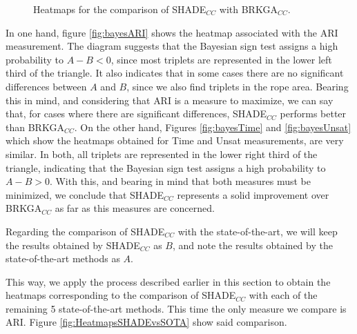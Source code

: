 \begin{figure}[bth]
	\myfloatalign
	 \quad
	\caption[Heatmaps for the comparison of SHADE$_{CC}$ with BRKGA$_{CC}$.]{Heatmaps for the comparison of \acs{SHADE}$_{CC}$ with \acs{BRKGA}$_{CC}$.}
	\label{fig:HeatmapsSHADEvsBRKGA}
\end{figure}

In one hand, figure \ref{fig:bayesARI} shows the heatmap associated with the \acs{ARI} measurement. The diagram suggests that the Bayesian sign test assigns a high probability to $A - B < 0$, since most triplets are represented in the lower left third of the triangle. It also indicates that in some cases there are no significant differences between $A$ and $B$, since we also find triplets in the rope area. Bearing this in mind, and considering that \acs{ARI} is a measure to maximize, we can say that, for cases where there are significant differences, \acs{SHADE}$_{CC}$ performs better than \acs{BRKGA}$_{CC}$. On the other hand, Figures \ref{fig:bayesTime} and \ref{fig:bayesUnsat} which show the heatmaps obtained for Time and Unsat measurements, are very similar. In both, all triplets are represented in the lower right third of the triangle, indicating that the Bayesian sign test assigns a high probability to $A - B > 0$. With this, and bearing in mind that both measures must be minimized, we conclude that \acs{SHADE}$_{CC}$ represents a solid improvement over \acs{BRKGA}$_{CC}$ as far as this measures are concerned.

Regarding the comparison of \acs{SHADE}$_{CC}$ with the state-of-the-art, we will keep the results obtained by \acs{SHADE}$_{CC}$ as $B$, and note the results obtained by the state-of-the-art methods as $A$.

This way, we apply the process described earlier in this section to obtain the heatmaps corresponding to the comparison of \acs{SHADE}$_{CC}$ with each of the remaining 5 state-of-the-art methods. This time the only measure we compare is \acs{ARI}. Figure \ref{fig:HeatmapsSHADEvsSOTA} show said comparison.

